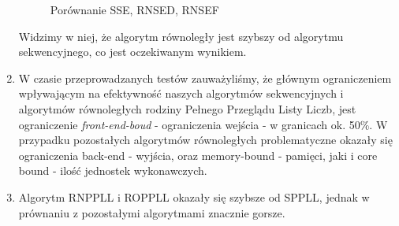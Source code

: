 \documentclass{article}
\begin{document}
\begin{enumerate}
\begin{figure}[H]
                    \caption{Porównanie \gls{SSE}, \gls{RNSED}, \gls{RNSEF}}
                \end{figure}
            Widzimy w niej, że algorytm równoległy jest szybszy od algorytmu sekwencyjnego, co jest oczekiwanym wynikiem.
            \item W czasie przeprowadzanych testów zauważyliśmy, że głównym ograniczeniem wpływającym na efektywność naszych algorytmów sekwencyjnych i algorytmów równoległych rodziny Pełnego Przeglądu Listy Liczb, jest ograniczenie \emph{front-end-boud} - ograniczenia wejścia - w granicach ok. 50\%. W przypadku pozostałych algorytmów równoległych problematyczne okazały się ograniczenia back-end - wyjścia, oraz memory-bound - pamięci, jaki i core bound - ilość jednostek wykonawczych.
            \item Algorytm \gls{RNPPLL} i \gls{ROPPLL} okazały się szybsze od \gls{SPPLL}, jednak w prównaniu z pozostałymi algorytmami znacznie gorsze.
        \end{enumerate}
    
    \clearpage
    \printnoidxglossaries
\end{document}
